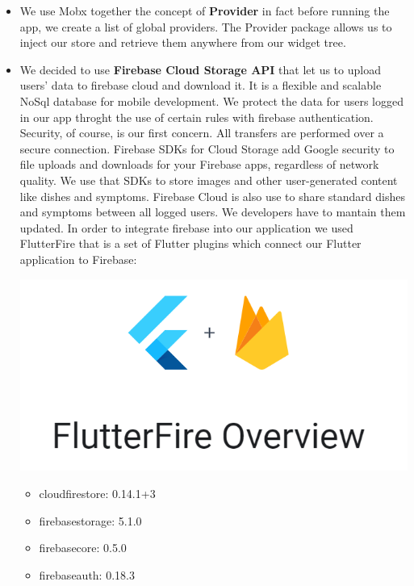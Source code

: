 \documentclass [12pt]{article}
\begin{document}
\begin{itemize}
\begin{figure}[ht!]
\end{figure}
\\
\item We use Mobx together the concept of \textbf{Provider} in fact before running the app, we create a list of global providers. 
The Provider package allows us to inject our store and retrieve them anywhere from our widget tree.
\item We decided to use \textbf{Firebase Cloud Storage API} that let us to upload  users' data to firebase cloud and download it. It is a flexible and scalable NoSql database for mobile development. We protect the data for users logged in our app throght the use of certain rules with firebase authentication. Security, of course, is our first concern. All transfers are performed over a secure connection.
Firebase SDKs for Cloud Storage add Google security to file uploads and downloads for your Firebase apps, regardless of network quality. We use that SDKs to store images and other user-generated content like dishes and symptoms. 
Firebase Cloud is also use to share standard dishes and symptoms  between all logged users. We developers have to mantain them updated. 
In order to integrate firebase into our application we used FlutterFire that is a set of Flutter plugins which connect our Flutter application to Firebase:
\\
\begin{minipage}{0.3\linewidth}
    \includegraphics[width=\linewidth]{FlutterAndFirebase.PNG}
\end{minipage}\hfil
\begin{minipage}{0.55\linewidth}
\begin{itemize}[•]
\item cloud\textunderscore firestore: 0.14.1+3
\item firebase\textunderscore storage: 5.1.0
\item firebase\textunderscore core: 0.5.0
\item firebase\textunderscore auth: 0.18.3
\end{itemize}
\end{minipage}


\end{itemize}
\end{document}
